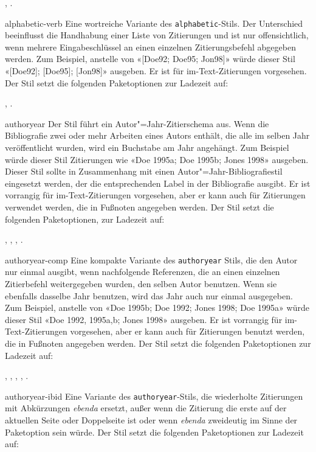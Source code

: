 \documentclass{ltxdockit}[2011/03/25]
\begin{document}
\begin{marglist}
, .        

\item[alphabetic-verb] Eine wortreiche Variante des \texttt{alphabetic}-Stils. 
Der Unterschied beeinflusst die Handhabung einer Liste von Zitierungen und ist nur
offensichtlich, wenn mehrere Eingabeschlüssel an einen einzelnen
Zitierungsbefehl abgegeben werden. Zum Beispiel, anstelle von «[Doe92; Doe95;
Jon98]» würde dieser Stil «[Doe92]; [Doe95]; [Jon98]» ausgeben. Er ist für
im-Text-Zitierungen vorgesehen. Der Stil setzt die folgenden Paketoptionen zur
Ladezeit auf:

, .   

\item[authoryear] Der Stil führt ein Autor"=Jahr-Zitierschema aus. Wenn die 
Bibliografie zwei
oder mehr Arbeiten eines Autors enthält, die alle im selben Jahr veröffentlicht
wurden, wird ein Buchstabe am Jahr angehängt. Zum Beispiel würde dieser Stil
Zitierungen wie «Doe 1995a; Doe 1995b; Jones 1998» ausgeben. Dieser Stil sollte
in Zusammenhang mit einen Autor"=Jahr-Bibliografiestil eingesetzt werden, der
die entsprechenden Label in der Bibliografie ausgibt. Er ist vorrangig für
im-Text-Zitierungen vorgesehen, aber er kann auch für Zitierungen verwendet
werden, die in Fußnoten angegeben werden. Der Stil setzt die folgenden
Paketoptionen, zur Ladezeit auf: 

, , , .

\item[authoryear-comp] Eine kompakte Variante des \texttt{authoryear} Stils, 
die den Autor nur einmal
ausgibt, wenn nachfolgende Referenzen, die an einen einzelnen Zitierbefehl
weitergegeben wurden, den selben Autor benutzen. Wenn sie ebenfalls dasselbe
Jahr benutzen, wird das Jahr auch nur einmal ausgegeben. Zum Beispiel, anstelle
von «Doe 1995b; Doe 1992; Jones 1998; Doe 1995a» würde dieser Stil «Doe 1992,
1995a,b; Jones 1998» ausgeben. Er ist vorrangig für im-Text-Zitierungen
vorgesehen, aber er kann auch für Zitierungen benutzt werden, die in Fußnoten
angegeben werden. Der Stil setzt die folgenden Paketoptionen zur Ladezeit auf:

 , , , , .
      

\item[authoryear-ibid] Eine Variante des \texttt{authoryear}-Stils, die
wiederholte Zitierungen 
mit Abkürzungen \emph{ebenda} ersetzt, außer wenn die Zitierung die erste auf der
aktuellen Seite oder Doppelseite ist oder wenn \emph{ebenda} zweideutig im Sinne
der Paketoption  sein würde. Der Stil setzt die
folgenden Paketoptionen zur Ladezeit auf: 


\end{marglist}
\end{document}

